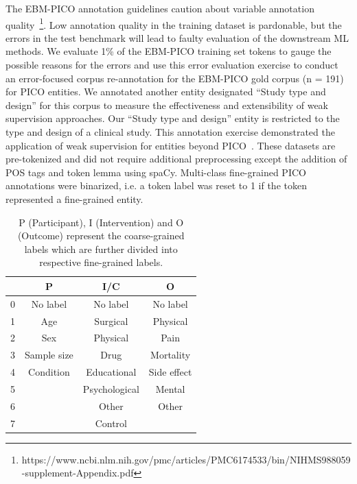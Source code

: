\documentclass[10.7pt,]{article}
\begin{document}
The EBM-PICO annotation guidelines caution about variable annotation quality~\footnote{https://www.ncbi.nlm.nih.gov/pmc/articles/PMC6174533/bin/NIHMS988059-supplement-Appendix.pdf}.
Low annotation quality in the training dataset is pardonable, but the errors in the test benchmark will lead to faulty evaluation of the downstream ML methods.
We evaluate 1\% of the EBM-PICO training set tokens to gauge the possible reasons for the errors and use this error evaluation exercise to conduct an error-focused corpus re-annotation for the EBM-PICO gold corpus (n = 191) for PICO entities.
We annotated another entity designated ``Study type and design'' for this corpus to measure the effectiveness and extensibility of weak supervision approaches.
Our ``Study type and design'' entity is restricted to the type and design of a clinical study.
This annotation exercise demonstrated the application of weak supervision for entities beyond PICO~\cite{menard2019turning}.
These datasets are pre-tokenized and did not require additional preprocessing except the addition of POS tags and token lemma using spaCy.
Multi-class fine-grained PICO annotations were binarized, i.e. a token label was reset to 1 if the token represented a fine-grained entity.
%
%
%
\begin{table}[h!]
\begin{center}
\begin{tabular}{| c | c | c | c |} 
\hline
 & P & I/C & O \\ 
\hline
0 & No label & No label & No label \\ 
1 & Age & Surgical & Physical \\ 
2 & Sex & Physical & Pain \\
3 & Sample size & Drug & Mortality \\
4 & Condition & Educational & Side effect \\
5 &  & Psychological & Mental \\
6 &  & Other & Other \\
7 &  & Control &  \\
\hline
\end{tabular}
\caption{\label{tab:coarsefineconcept} P (Participant), I (Intervention) and O (Outcome) represent the coarse-grained labels which are further divided into respective fine-grained labels.}
\end{center}
\end{table}
%
%
%
\end{document}
